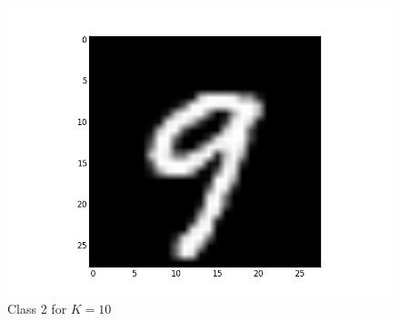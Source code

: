\documentclass[submit]{harvardml}
\begin{document}
\begin{figure}[ht]
    \includegraphics[scale=0.20]{representative-1-2}
    \caption{Class 2 for $K=10$}
\end{figure}
\end{document}
